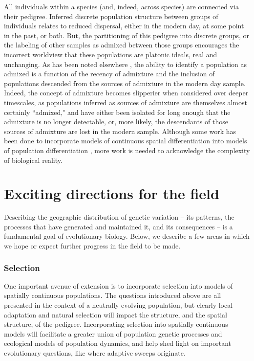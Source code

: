 \documentclass{ar-1col}
\newcommand{\g}[1]{{\color{blue}{#1}}}
\newcommand{\todo}[1]{{\textbf{\color{red}{#1}}}}
\begin{document}
All individuals within a species 
(and, indeed, across species) 
are connected via their pedigree.  
Inferred discrete population structure between groups of individuals 
relates to reduced dispersal, 
either in the modern day, at some point in the past, or both.
But, the partitioning of this pedigree into discrete groups, 
or the labeling of other samples as admixed between those groups
encourages the incorrect worldview that these populations are platonic ideals,
real and unchanging.
As has been noted elsewhere \citep{reich_india_2009,patterson_ancient_2012,hellenthal2014genetic,lawson2018tutorial},
the ability to identify a population as admixed
is a function of the recency of admixture and
the inclusion of populations descended 
from the sources of admixture in the modern day sample.
Indeed, the concept of admixture becomes slipperier when considered over deeper timescales,
as populations inferred as sources of admixture are themselves almost certainly ``admixed,"
and have either been isolated for long enough that the admixture is no longer detectable,
or, more likely, the descendants of those sources of admixture are lost in the modern sample.
Although some work has been done to incorporate models of continuous spatial differentiation 
into models of population differentiation \citep{conStruct}, 
more work is needed to acknowledge the complexity of biological reality.

\g{feel like i'm not making the point clearly}

\todo{read through, edit, rewrite?}

\section{Exciting directions for the field}

Describing the geographic distribution of genetic variation -- 
its patterns, 
the processes that have generated and maintained it, 
and its consequences -- 
is a fundamental goal of evolutionary biology.
Below, we describe a few areas 
in which we hope or expect further progress in the field to be made.

\subsubsection{Selection}
One important avenue of extension is to incorporate selection into 
models of spatially continuous populations. 
The questions introduced above are all presented in the context 
of a neutrally evolving population,
but clearly local adaptation and natural selection will impact 
the structure, and the spatial structure, of the pedigree.
Incorporating selection into spatially continuous models 
will facilitate a greater union of population genetic processes 
and ecological models of population dynamics, 
and help shed light on important evolutionary questions, 
like where adaptive sweeps originate. 
\g{more about why this is hard?}
\end{document}
